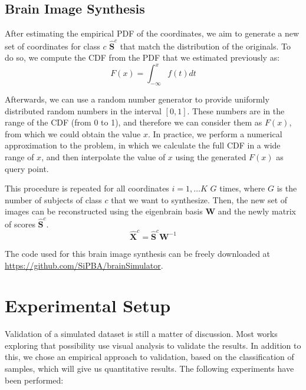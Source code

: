 \subsection{Brain Image Synthesis}
After estimating the empirical \ac{PDF} of the coordinates, we aim to generate a new set of coordinates for class $c$ $\widehat{\mathbf{S}}^c$ that match the distribution of the originals. To do so, we compute the \ac{CDF} from the \ac{PDF} that we estimated previously as:
\begin{equation}
F(x) = \int_{-\infty}^{x} f(t)dt
\end{equation}

Afterwards, we can use a random number generator to provide uniformly distributed random numbers in the interval $[0,1]$. These numbers are in the range of the \ac{CDF} (from 0 to 1), and therefore we can consider them as $F(x)$, from which we could obtain the value $x$. In practice, we perform a numerical approximation to the problem, in which we calculate the full \ac{CDF} in a wide range of $x$, and then interpolate the value of $x$ using the generated $F(x)$ as query point. 

This procedure is repeated for all coordinates $i=1,\dots K$ $G$ times, where $G$ is the number of subjects of class $c$ that we want to synthesize. Then, the new set of images can be reconstructed using the eigenbrain basis $\mathbf{W}$ and the newly matrix of scores $\widehat{\mathbf{S}}^c$. 
\begin{equation}
\widehat{\mathbf{X}}^c =\widehat{\mathbf{S}}^c\mathbf{W}^{-1} 
\end{equation}

The code used for this brain image synthesis can be freely downloaded at \url{https://github.com/SiPBA/brainSimulator}.

\section{Experimental Setup}
Validation of a simulated dataset is still a matter of discussion. Most works exploring that possibility \cite{Ma1993,KwanEvansPike1999} use visual analysis to validate the results. In addition to this, we chose an empirical approach to validation, based on the classification of samples, which will give us quantitative results. The following experiments have been performed: 


